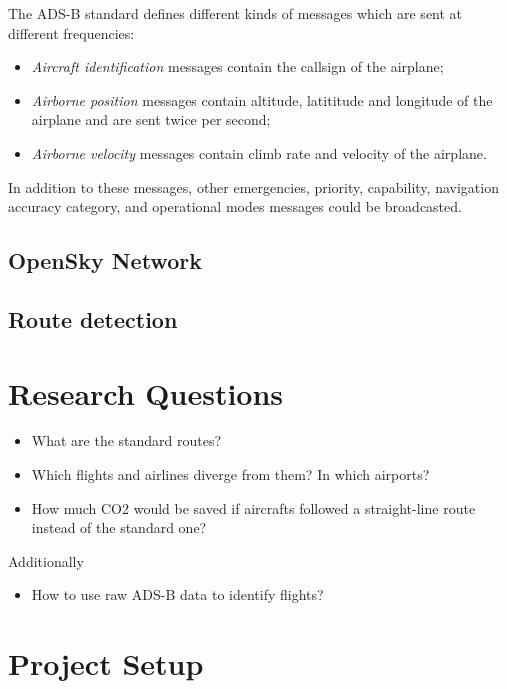 \documentclass{vldb}
\begin{document}
    The ADS-B standard defines different kinds of messages which are sent at different frequencies:
    \begin{itemize}
        \item \textit{Aircraft identification} messages contain the callsign of the airplane;
        \item \textit{Airborne position} messages contain altitude, latititude and longitude of the airplane and are sent twice per second;
        \item \textit{Airborne velocity} messages contain climb rate and velocity of the airplane.
    \end{itemize}
    In addition to these messages, other emergencies, priority, capability, navigation accuracy category, and operational modes messages could be broadcasted.

\subsection{OpenSky Network}

\subsection{Route detection}

\section{Research Questions}

\begin{itemize}
  \item What are the standard routes?
  \item Which flights and airlines diverge from them? In which airports?
  \item How much CO2 would be saved if aircrafts followed a straight-line route
  instead of the standard one?
\end{itemize}

Additionally

\begin{itemize}
  \item How to use raw ADS-B data to identify flights?
\end{itemize}

\section{Project Setup}
\end{document}

